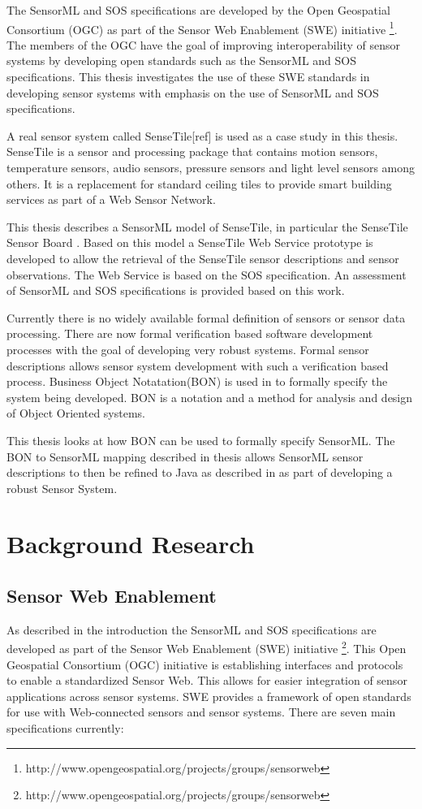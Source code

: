 \documentclass[]{final_report}
\begin{document}
The SensorML and SOS specifications are developed by the Open Geospatial Consortium (OGC) as part of the Sensor Web Enablement (SWE) initiative \footnote{http://www.opengeospatial.org/projects/groups/sensorweb}. The members of the OGC have the goal of improving interoperability of sensor systems by developing open standards such as the SensorML and SOS specifications. This thesis investigates the use of these SWE standards in developing sensor systems with emphasis on the use of SensorML and SOS specifications.

A real sensor system called SenseTile[ref] is used as a case study in this thesis. SenseTile is a sensor and processing package that contains motion sensors, temperature sensors, audio sensors, pressure sensors and light level sensors among others. It is a replacement for standard ceiling tiles to provide smart building services as part of a Web Sensor Network.

This thesis describes a  SensorML model of SenseTile, in particular the SenseTile Sensor Board . Based on this model a SenseTile Web Service prototype is developed to allow the retrieval of the SenseTile sensor descriptions and sensor observations. The Web Service is based on the SOS specification. An assessment of SensorML and SOS specifications is provided based on this work.

Currently there is no widely available formal definition of sensors or sensor data processing. There are now formal verification based software development processes \cite{Kiniryref} with the goal of developing very robust systems.  Formal sensor descriptions allows sensor system development with such a verification based process. Business Object Notatation(BON)\cite{BONref} is used in \cite{Kiniryref} to formally specify the system being developed. BON is a notation and a method for analysis and design of Object Oriented systems. 

This thesis looks at how BON can be used to formally specify SensorML. The BON to SensorML mapping described in thesis allows SensorML sensor descriptions to then be refined to Java as described in \cite{Kiniryref} as part of developing a robust Sensor System.


\chapter{ Background Research}

\section{Sensor Web Enablement}\label{SWESec}
As described in the introduction the SensorML and SOS specifications are developed as part of the Sensor Web Enablement (SWE) initiative \footnote{http://www.opengeospatial.org/projects/groups/sensorweb}. This Open Geospatial Consortium (OGC) initiative is establishing interfaces and protocols to enable a standardized Sensor Web. This allows for easier integration of sensor applications across sensor systems. SWE provides a framework of open standards for use with Web-connected sensors and sensor systems. There are seven main specifications currently:
\end{document}
